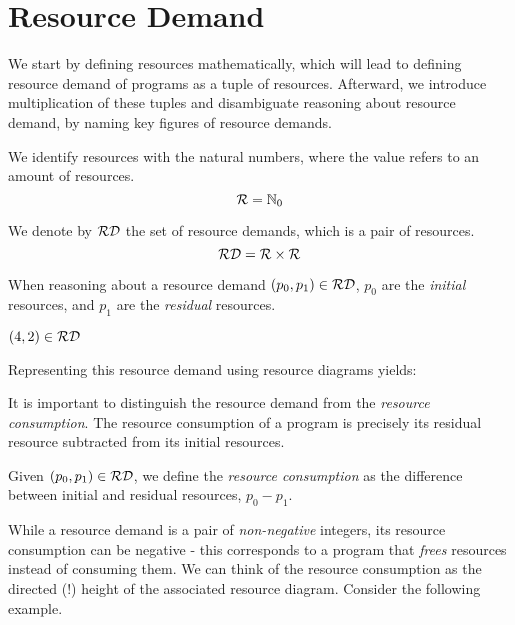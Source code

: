 \section{Resource Demand}

We start by defining resources mathematically, which will lead to defining resource demand of programs as a tuple of resources. Afterward, we introduce multiplication of these tuples and disambiguate reasoning about resource demand, by naming key figures of resource demands.

\begin{definition}[Resources]\label{def:resources}
   We identify resources with the natural numbers, where the value refers to an amount of resources.
   \[
      \mathcal{R} = \mathbb{N}_0
   \]
\end{definition}


\begin{definition}\label{def:resource-pair}
   We denote by \(\mathcal{RD}\) the set of resource demands, which is a pair of resources.
   \[
      \mathcal{RD} = \mathcal{R} \times \mathcal{R}
   \]
\end{definition}

When reasoning about a resource demand \((p_0, p_1) \in \mathcal{RD}\), \(p_0\) are the \emph{initial} resources, and \(p_1\) are the \emph{residual} resources. 

\begin{example}
   \((4, 2) \in \mathcal{RD}\)

Representing this resource demand using resource diagrams yields:


\end{example}

It is important to distinguish the resource demand from the \emph{resource consumption}. The resource consumption of a program is precisely its residual resource subtracted from its initial resources. 

\begin{definition}\label{def:resource-consumption}
   Given \((p_0, p_1) \in \mathcal{RD}\), we define the \emph{resource consumption} as the difference between initial and residual resources, \(p_0 - p_1\).
\end{definition}

While a resource demand is a pair of \emph{non-negative} integers, its resource consumption can be negative - this corresponds to a program that \emph{frees} resources instead of consuming them. We can think of the resource consumption as the directed (!) height of the associated resource diagram. Consider the following example.

